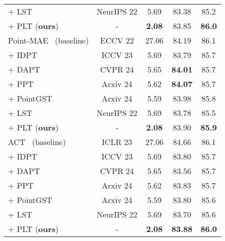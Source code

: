 \begin{table}
\begin{tabular}{lcccc}
    + LST~\cite{sung2022lst} & NeurIPS 22 & 5.69 & 83.38 & 85.2 \\
    \rowcolor{linecolor!40}+ PLT (\textbf{ours})& - & \textbf{2.08}  & 83.85 & \textbf{86.0} \\
    \midrule
    Point-MAE~\cite{pang2022masked} (baseline) &  ECCV 22 & 27.06 & 84.19 & 86.1 \\ 
    + IDPT~\cite{zha2023instance} & ICCV 23 & 5.69  & 83.79  & 85.7  \\
    + DAPT~\cite{zhou2024dynamic} & CVPR 24 & 5.65  & \textbf{84.01} & 85.7 \\
    + PPT~\cite{zhang2024positional} & Arxiv 24 & 5.62  & \textbf{84.07} & 85.7 \\
    + PointGST~\cite{liang2024parameter} & Arxiv 24 & 5.59  & 83.98 & 85.8 \\
    + LST~\cite{sung2022lst} & NeurIPS 22 & 5.69 & 83.78 & 85.5\\
    \rowcolor{linecolor!40}+ PLT (\textbf{ours})& - & \textbf{2.08}  & 83.90 & \textbf{85.9} \\
    \midrule
    ACT~\cite{dong2022autoencoders} (baseline)  & ICLR 23 &  27.06 & 84.66 & 86.1 \\
    + IDPT~\cite{zha2023instance} & ICCV 23 & 5.69  & 83.80  & 85.7  \\
    + DAPT~\cite{zhou2024dynamic} & CVPR 24 & 5.65  & 83.56 & 85.7 \\
    + PPT~\cite{zhang2024positional} & Arxiv 24 & 5.62  & 83.83 & 85.7 \\
    + PointGST~\cite{liang2024parameter} & Arxiv 24 & 5.59  & 83.80 & 85.6 \\
    + LST~\cite{sung2022lst} & NeurIPS 22 & 5.69 & 83.70 & 85.6\\
    \rowcolor{linecolor!40}+ PLT (\textbf{ours})& - & \textbf{2.08}  & \textbf{83.88} & \textbf{86.0} \\
    \bottomrule
    \end{tabular}
  \label{tab:segmentation}
\end{table}